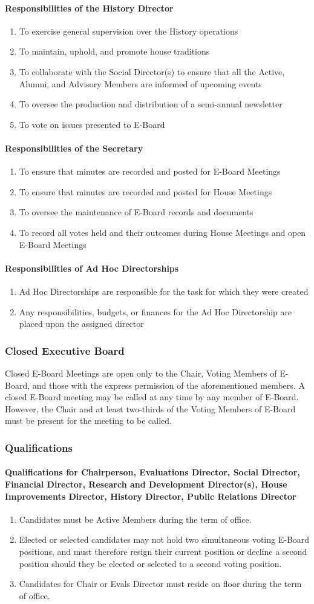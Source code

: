 \documentclass{article}
\newcommand{\asubsection}[1]{\subsubsection{#1} \label{#1}}
\newcommand{\asubsubsection}[1]{\paragraph{#1} \label{#1}}
\begin{document}
\asubsubsection{Responsibilities of the History Director}
\begin{enumerate}
	\item To exercise general supervision over the History operations
	\item To maintain, uphold, and promote house traditions
	\item To collaborate with the Social Director(s) to ensure that all the Active, Alumni, and Advisory Members are informed of upcoming events
	\item To oversee the production and distribution of a semi-annual newsletter
	\item To vote on issues presented to E-Board
\end{enumerate}

\asubsubsection{Responsibilities of the Secretary}
\begin{enumerate}
	\item To ensure that minutes are recorded and posted for E-Board Meetings
	\item To ensure that minutes are recorded and posted for House Meetings
	\item To oversee the maintenance of E-Board records and documents
	\item To record all votes held and their outcomes during House Meetings and open E-Board Meetings
\end{enumerate}

\asubsubsection{Responsibilities of Ad Hoc Directorships}
\begin{enumerate}
	\item Ad Hoc Directorships are responsible for the task for which they were created
	\item Any responsibilities, budgets, or finances for the Ad Hoc Directorship are placed upon the assigned director
\end{enumerate}

\asubsection{Closed Executive Board}
Closed E-Board Meetings are open only to the Chair, Voting Members of E-Board, and those with the express permission of the aforementioned members.
A closed E-Board meeting may be called at any time by any member of E-Board.
However, the Chair and at least two-thirds of the Voting Members of E-Board must be present for the meeting to be called.

\asubsection{Qualifications}

\asubsubsection{Qualifications for Chairperson, Evaluations Director, Social Director, Financial Director, Research and Development Director(s), House Improvements Director, History Director, Public Relations Director}
\begin{enumerate}
	\item Candidates must be Active Members during the term of office.
	\item Elected or selected candidates may not hold two simultaneous voting E-Board positions, and must therefore resign their current position or decline a second position should they be elected or selected to a second voting position.
	\item Candidates for Chair or Evals Director must reside on floor during the term of office.
\end{enumerate}
\end{document}
